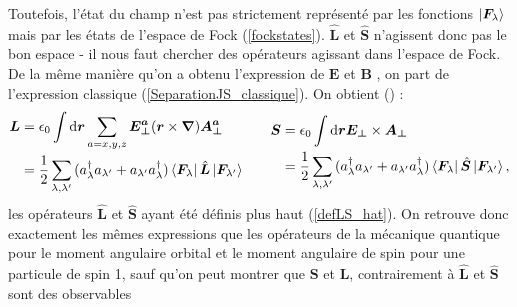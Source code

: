 Toutefois, l'état du champ n'est pas strictement représenté par les fonctions $\ket{\bm{F}_\lambda}$ mais par les états de l'espace de Fock (\ref{fockstates}). $\hat{\bm{L}}$ et $\hat{\bm{S}}$ n'agissent donc pas le bon espace - il nous faut chercher des opérateurs agissant dans l'espace de Fock. De la même manière qu'on a obtenu l'expression de $\bm{E}$ et $\bm{B}$ , on part de l'expression classique (\ref{SeparationJS_classique}). On obtient () :
\begin{equation*}
\begin{aligned}[c]
\bm{L}&=\epsilon_0\int{\mathrm{d}\bm{r}\sum_{a=x,y,z} \bm{E^a_{\bot}}(\bm{r}\times\bm{\nabla})\bm{A^a_{\bot}}}\\
&=\frac{1}{2}\sum_{\lambda,\lambda'}{(a^{\dag}_{\lambda}a_{\lambda'}+a_{\lambda'}a^{\dag}_{\lambda})}\bra{\bm{F}_\lambda}\hat{\bm{L}}\ket{\bm{F}_{\lambda'}}
\end{aligned}
\qquad
\begin{aligned}[c]
\bm{S}&=\epsilon_0\int{\mathrm{d}\bm{r}\bm{E_{\bot}}\times\bm{A_{\bot}}}\\
&=\frac{1}{2}\sum_{\lambda,\lambda'}{(a^{\dag}_{\lambda}a_{\lambda'}+a_{\lambda'}a^{\dag}_{\lambda})}\bra{\bm{F}_\lambda}\hat{\bm{S}}\ket{\bm{F}_{\lambda'}},
\end{aligned}
\end{equation*} 
les opérateurs $\hat{\bm{L}}$ et $\hat{\bm{S}}$ ayant été définis plus haut (\ref{defLS_hat}).
On retrouve donc exactement les mêmes expressions que les opérateurs de la mécanique quantique pour le moment angulaire orbital et le moment angulaire de spin pour une particule de spin 1, sauf qu'on peut montrer que $\bm{S}$ et $\bm{L}$, contrairement à $\hat{\bm{L}}$ et $\hat{\bm{S}}$ sont des observables
